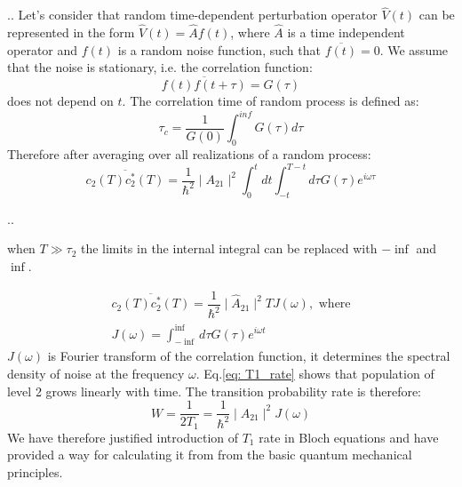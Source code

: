 \documentclass[handout]{beamer}
\begin{document}
\begin{frame}{\thesection.\thesubsection. \insertsubsection}
	Let's consider that random time-dependent perturbation operator $\hat{V}(t)$ can be represented in the form $\hat{V}(t) = \hat{A} f(t)$, where $\hat{A}$ is a time independent operator and $f(t)$ is a random noise function, such that $\overline{f(t)} = 0$.
	We assume that the noise is stationary, i.e. the correlation function:
	\begin{equation}
	\overline{f(t)f(t+ \tau)}=G(\tau)
	\end{equation}
	does not depend on $t$. The correlation time of random process is defined as:
	\begin{equation}
	\tau_c = \dfrac{1}{G(0)} \int_{0}^{inf} G(\tau) d\tau
	\end{equation}
	Therefore after averaging over all realizations of a random process:
	\begin{equation}
	\overline{c_2(T) c_2^*(T)} = \dfrac{1}{\hbar^2}\mid A_{21} \mid^2 \int_{0}^{t}dt \int_{-t}^{T-t} d\tau G(\tau) e^{i \omega \tau}
	\end{equation}
	
\end{frame}


\begin{frame}{\thesection.\thesubsection. \insertsubsection}
	
	when $T \gg \tau_2$ the limits in the internal integral can be replaced with $-\inf$ and $\inf$. 
	
	\begin{align} \label{eq: T1_rate}
	\overline{c_2(T) c_2^*(T)}=\dfrac{1}{\hbar^2}\mid \hat{A}_{21}\mid^2 T J(\omega), \text{ where} \\
	J(\omega)= \int_{-\inf}^{\inf} d\tau G(\tau) e^{i \omega t}
	\end{align}
	$J(\omega)$  is  Fourier transform of the correlation function, it determines the spectral density of noise at the frequency $\omega$. Eq.\ref{eq: T1_rate} shows that population of level 2 grows linearly with time. The transition probability rate is therefore:
	\begin{equation}
	   W = \dfrac{1}{2 T_1} = \dfrac{1}{\hbar^2} \mid A_{21} \mid^2 J(\omega)
	\end{equation}
	We have therefore justified introduction of $T_1$ rate in Bloch equations and have provided a way for calculating it from from the basic quantum mechanical principles.
	

	
\end{frame}
\end{document}
